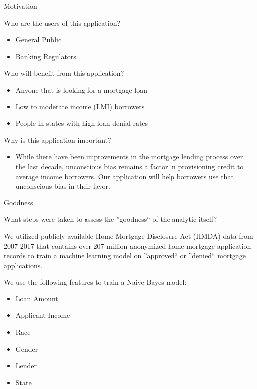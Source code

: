 \documentclass{beamer}
\begin{document}
\begin{frame}{Motivation}

Who are the users of this application? 

\begin{itemize}
  \item General Public
  \item Banking Regulators 
\end{itemize}

Who will benefit from this application? 

\begin{itemize}
   \item Anyone that is looking for a mortgage loan
    \item Low to moderate income (LMI) borrowers
    \item People in states with high loan denial rates
\end{itemize}

Why is this application important? \vspace{2mm}

\begin{itemize}
  \item While there have been improvements in the mortgage lending process over the last decade, unconscious bias remains a factor in provisioning credit to average income borrowers.  Our application will help borrowers use that unconscious bias in their favor. 
\end{itemize}



\end{frame}

\begin{frame}{Goodness}

What steps were taken to assess the ''goodness`` of the analytic itself? \vspace{2mm}

We utilized publicly available Home Mortgage Disclosure Act (HMDA) data from 2007-2017 that contains over 207 million anonymized home mortgage application records to train a machine learning model on ''approved`` or ''denied`` mortgage applications.  \vspace{2mm}

We use the following features to train a Naive Bayes model:

    \begin{multicols}{3}
\begin{itemize}
  \item Loan Amount
  \item Applicant Income
  \item Race
  \item Gender
  \item Lender
  \item State
\end{itemize}
\end{multicols}

\end{frame}
\end{document}
